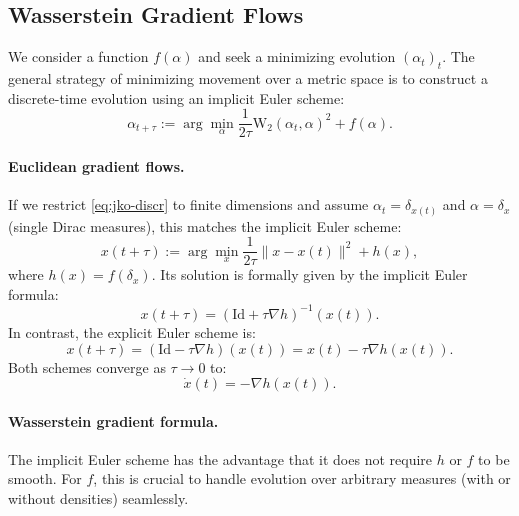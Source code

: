 \subsection{Wasserstein Gradient Flows}

We consider a function $f(\alpha)$ and seek a minimizing evolution $(\alpha_t)_t$. The general strategy of minimizing movement over a metric space is to construct a discrete-time evolution using an implicit Euler scheme:
\begin{equation}
    \alpha_{t+\tau} := \arg\min_\alpha \frac{1}{2 \tau} \mathrm{W}_2(\alpha_t, \alpha)^2 + f(\alpha). \label{eq:jko-discr}
\end{equation}

\paragraph{Euclidean gradient flows.}

If we restrict \eqref{eq:jko-discr} to finite dimensions and assume $\alpha_t = \delta_{x(t)}$ and $\alpha = \delta_x$ (single Dirac measures), this matches the implicit Euler scheme:
\begin{equation*}
    x(t+\tau) := \arg\min_x \frac{1}{2 \tau} \|x - x(t)\|^2 + h(x),
\end{equation*}
where $h(x) = f(\delta_x)$. Its solution is formally given by the implicit Euler formula:
\begin{equation*}
    x(t+\tau) = (\mathrm{Id} + \tau \nabla h)^{-1}(x(t)).
\end{equation*}
In contrast, the explicit Euler scheme is:
\begin{equation*}
    x(t+\tau) = (\mathrm{Id} - \tau \nabla h)(x(t)) = x(t) - \tau \nabla h(x(t)).
\end{equation*}
Both schemes converge as $\tau \to 0$ to:
\begin{equation}
    \dot{x}(t) = -\nabla h(x(t)). \label{eq:grad-flow-classical}
\end{equation}


\paragraph{Wasserstein gradient formula.}

The implicit Euler scheme has the advantage that it does not require $h$ or $f$ to be smooth. For $f$, this is crucial to handle evolution over arbitrary measures (with or without densities) seamlessly.

